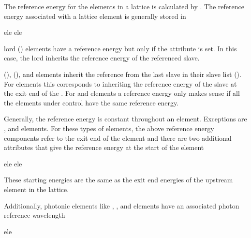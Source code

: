 {{{{{{{{
The reference energy for the elements in a lattice is calculated by
.
The reference energy associated with a lattice element is generally stored in
\begin{example}
  ele%
  ele%
\end{example}

 lord () elements have a
reference energy but only if the  attribute is set. In
this case, the  lord inherits the reference energy of
the referenced slave.

 (),  (), and
 elements inherit the reference from the last slave in
their slave list (). For  elements
this corresponds to inheriting the reference energy of the slave at
the exit end of the . For  and 
elements a reference energy only makes sense if all the elements under
control have the same reference energy.

Generally, the reference energy is constant throughout an
element. Exceptions are ,  and 
elements. For these types of elements, the above reference energy
components refer to the exit end of the element and there are two
additional attributes that give the reference energy at the start of
the element
\begin{example}
  ele%
  ele%
\end{example}
These starting energies are the same as the exit end energies of the upstream element in the lattice.

Additionally, photonic elements like , ,
 and  elements have an associated photon reference wavelength
\begin{example}
  ele%
\end{example}

}}}}}}}}
